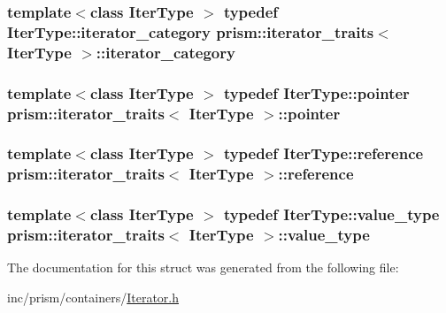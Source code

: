 \subsubsection[{\texorpdfstring{iterator\+\_\+category}{iterator_category}}]{\setlength{\rightskip}{0pt plus 5cm}template$<$class Iter\+Type $>$ typedef Iter\+Type\+::iterator\+\_\+category {\bf prism\+::iterator\+\_\+traits}$<$ Iter\+Type $>$\+::{\bf iterator\+\_\+category}}\hypertarget{structprism_1_1iterator__traits_a2e20906a677a5a465bf343ff4281a010}{}\label{structprism_1_1iterator__traits_a2e20906a677a5a465bf343ff4281a010}
\subsubsection[{\texorpdfstring{pointer}{pointer}}]{\setlength{\rightskip}{0pt plus 5cm}template$<$class Iter\+Type $>$ typedef Iter\+Type\+::pointer {\bf prism\+::iterator\+\_\+traits}$<$ Iter\+Type $>$\+::{\bf pointer}}\hypertarget{structprism_1_1iterator__traits_a5ec4c84886d15b5efa1bb3fd0984dd71}{}\label{structprism_1_1iterator__traits_a5ec4c84886d15b5efa1bb3fd0984dd71}
\subsubsection[{\texorpdfstring{reference}{reference}}]{\setlength{\rightskip}{0pt plus 5cm}template$<$class Iter\+Type $>$ typedef Iter\+Type\+::reference {\bf prism\+::iterator\+\_\+traits}$<$ Iter\+Type $>$\+::{\bf reference}}\hypertarget{structprism_1_1iterator__traits_af4ddc7a938960bb8c558e6eae9ee1548}{}\label{structprism_1_1iterator__traits_af4ddc7a938960bb8c558e6eae9ee1548}
\subsubsection[{\texorpdfstring{value\+\_\+type}{value_type}}]{\setlength{\rightskip}{0pt plus 5cm}template$<$class Iter\+Type $>$ typedef Iter\+Type\+::value\+\_\+type {\bf prism\+::iterator\+\_\+traits}$<$ Iter\+Type $>$\+::{\bf value\+\_\+type}}\hypertarget{structprism_1_1iterator__traits_a764c6740051f048bb81ba63d993e96cd}{}\label{structprism_1_1iterator__traits_a764c6740051f048bb81ba63d993e96cd}


The documentation for this struct was generated from the following file\+:\begin{DoxyCompactItemize}
\item 
inc/prism/containers/\hyperlink{_iterator_8h}{Iterator.\+h}\end{DoxyCompactItemize}
